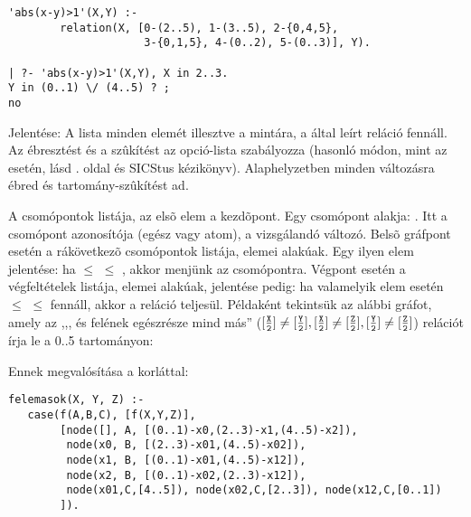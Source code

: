 \begin{verbatim}
'abs(x-y)>1'(X,Y) :-
        relation(X, [0-(2..5), 1-(3..5), 2-{0,4,5},
                     3-{0,1,5}, 4-(0..2), 5-(0..3)], Y).

| ?- 'abs(x-y)>1'(X,Y), X in 2..3.
Y in (0..1) \/ (4..5) ? ;
no
\end{verbatim}

\medskip
{}

Jelentése: A  lista minden elemét illesztve a 
mintára, a  által leírt reláció fennáll. Az ébresztést és a
szûkítést az  opció-lista szabályozza (hasonló módon, mint
az  esetén, lásd \pageref{all_distinct}. oldal és 
SICStus kézikönyv). Alaphelyzetben minden változásra ébred és
tartomány-szûkítést ad.

A  csomópontok listája, az elsõ elem a kezdõpont. Egy csomópont
alakja: . Itt  a csomópont azonosítója
(egész vagy atom),  a vizsgálandó változó. Belsõ gráfpont esetén
 a rákövetkezõ csomópontok listája, elemei 
alakúak. Egy ilyen elem jelentése: ha  $\leq$  $\leq$ ,
akkor menjünk az  csomópontra. Végpont esetén  a
végfeltételek listája, elemei  alakúak, jelentése pedig: ha
valamelyik elem esetén  $\leq$  $\leq$  fennáll, akkor
a reláció teljesül.
\br
Példaként tekintsük az alábbi gráfot, amely az ,,,  és 
felének egészrésze mind más'' (\([\frac{\texttt{X}}{\texttt{2}}]\neq[\frac{\texttt{Y}}{\texttt{2}}],
[\frac{\texttt{X}}{\texttt{2}}]\neq[\frac{\texttt{Z}}{\texttt{2}}],
[\frac{\texttt{Y}}{\texttt{2}}]\neq[\frac{\texttt{Z}}{\texttt{2}}]\)) relációt írja le a 0..5
tartományon:

\begin{center}\end{center}

Ennek megvalósítása a  korláttal:

\begin{verbatim}
felemasok(X, Y, Z) :-
   case(f(A,B,C), [f(X,Y,Z)],
        [node([], A, [(0..1)-x0,(2..3)-x1,(4..5)-x2]),
         node(x0, B, [(2..3)-x01,(4..5)-x02]),
         node(x1, B, [(0..1)-x01,(4..5)-x12]),
         node(x2, B, [(0..1)-x02,(2..3)-x12]),
         node(x01,C,[4..5]), node(x02,C,[2..3]), node(x12,C,[0..1])
        ]).
\end{verbatim}

